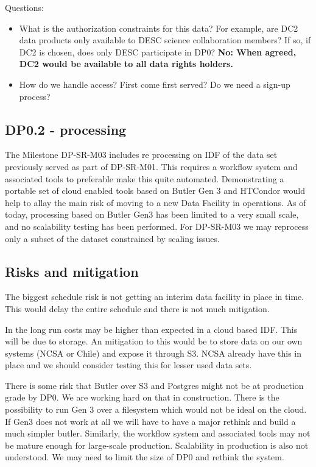 Questions:

\begin{itemize}

\item What is the authorization constraints for this data? For example, are DC2 data products only available to DESC science collaboration members? If so, if DC2 is chosen, does only DESC participate in DP0?
	{\bf No: When agreed, DC2 would be available to all data rights holders.}

\item How do we handle access? First come first served? Do we need a sign-up process?

\end{itemize}

\subsection{DP0.2 - processing}

The Milestone DP-SR-M03 includes re processing on IDF of the data set previously served as part of DP-SR-M01.
This requires a workflow system and associated tools to preferable make this quite automated.
Demonstrating a portable set of cloud enabled tools based on Butler Gen 3 and HTCondor would help to allay the main risk of moving to a new Data Facility in operations.
As of today, processing based on Butler Gen3 has been limited to a very small scale, and no scalability testing has been performed. For DP-SR-M03 we may reprocess only a subset of the dataset constrained by scaling issues.


\subsection{Risks and mitigation}

The biggest schedule risk is not getting an interim data facility in place in time.
This would delay the entire schedule and there is not much mitigation.

In the long run costs may be higher than expected in a cloud based IDF. This will be due to storage.
An mitigation to this would be to store data on our own systems (NCSA or Chile) and expose it through S3.
NCSA already have this in place and we should consider testing this for lesser used data sets.

There is some risk that  Butler over S3 and Postgres  might not be at  production grade by DP0. We are working hard on that in construction. There is the possibility to run Gen 3 over a filesystem which would not be ideal on the cloud. If Gen3 does not work at all we will have to have a major rethink and build a much simpler butler.
Similarly, the workflow system and associated tools may not be mature enough for large-scale production. Scalability in production is also not understood. We may need to limit the size of DP0 and rethink the system.
